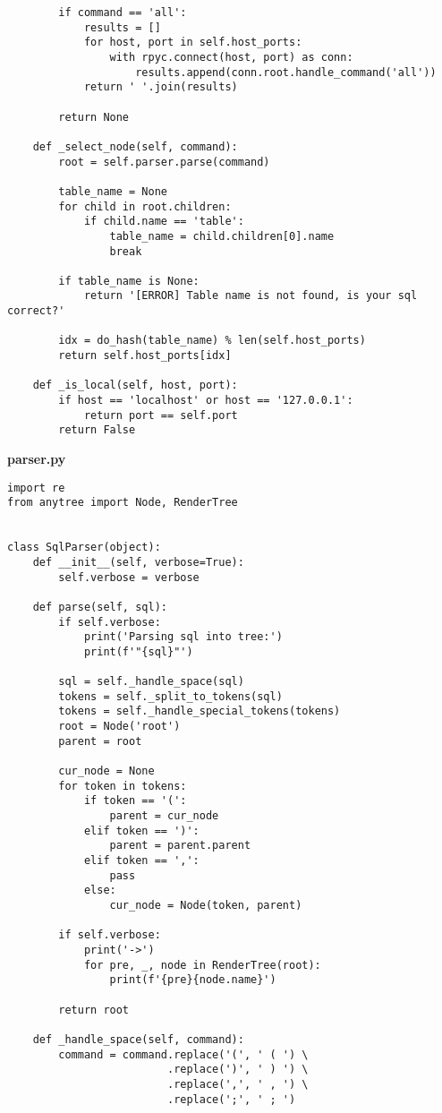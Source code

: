\begin{appendix}
\begin{lstlisting}
        if command == 'all':
            results = []
            for host, port in self.host_ports:
                with rpyc.connect(host, port) as conn:
                    results.append(conn.root.handle_command('all'))
            return ' '.join(results)

        return None
    
    def _select_node(self, command):
        root = self.parser.parse(command)

        table_name = None
        for child in root.children:
            if child.name == 'table':
                table_name = child.children[0].name
                break
        
        if table_name is None:
            return '[ERROR] Table name is not found, is your sql correct?'
            
        idx = do_hash(table_name) % len(self.host_ports)
        return self.host_ports[idx]

    def _is_local(self, host, port):
        if host == 'localhost' or host == '127.0.0.1':
            return port == self.port
        return False
\end{lstlisting}

\textbf{parser.py}

\begin{lstlisting}
import re
from anytree import Node, RenderTree


class SqlParser(object):
    def __init__(self, verbose=True):
        self.verbose = verbose
    
    def parse(self, sql):
        if self.verbose:
            print('Parsing sql into tree:')
            print(f'"{sql}"')

        sql = self._handle_space(sql)
        tokens = self._split_to_tokens(sql)
        tokens = self._handle_special_tokens(tokens)
        root = Node('root')
        parent = root

        cur_node = None
        for token in tokens:
            if token == '(':
                parent = cur_node
            elif token == ')':
                parent = parent.parent
            elif token == ',':
                pass
            else:
                cur_node = Node(token, parent)

        if self.verbose:
            print('->')
            for pre, _, node in RenderTree(root):
                print(f'{pre}{node.name}')
        
        return root
        
    def _handle_space(self, command):
        command = command.replace('(', ' ( ') \
                         .replace(')', ' ) ') \
                         .replace(',', ' , ') \
                         .replace(';', ' ; ') 
        

\end{lstlisting}
\end{appendix}
